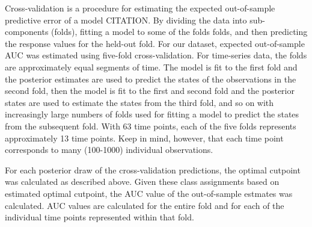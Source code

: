 \documentclass[12pt,letterpaper]{article}
\begin{document}
Cross-validation is a procedure for estimating the expected out-of-sample predictive error of a model CITATION. By dividing the data into sub-components (folds), fitting a model to some of the folds folds, and then predicting the response values for the held-out fold. For our dataset, expected out-of-sample AUC was estimated using five-fold cross-validation. For time-series data, the folds are approximately equal segments of time. The model is fit to the first fold and the posterior estimates are used to predict the states of the observations in the second fold, then the model is fit to the first and second fold and the posterior states are used to estimate the states from the third fold, and so on with increasingly large numbers of folds used for fitting a model to predict the states from the subsequent fold. With 63 time points, each of the five folds represents approximately 13 time points. Keep in mind, however, that each time point corresponds to many (100-1000) individual observations.

For each posterior draw of the cross-validation predictions, the optimal cutpoint was calculated as described above. Given these class assignments based on estimated optimal cutpoint, the AUC value of the out-of-sample estmates was calculated. AUC values are calculated for the entire fold and for each of the individual time points represented within that fold.
\end{document}
